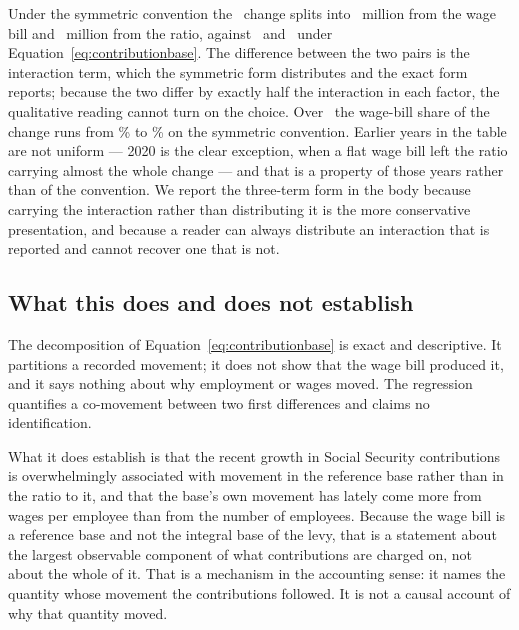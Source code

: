 

Under the symmetric convention the \BaseYear\ change splits into \SymmetricWageBill\
million from the wage bill and \SymmetricRatio\ million from the ratio, against
\BaseFromWageBill\ and \BaseFromRatio\ under Equation~\eqref{eq:contributionbase}. The
difference between the two pairs is the interaction term, which the symmetric form
distributes and the exact form reports; because the two differ by exactly half the
interaction in each factor, the qualitative reading cannot turn on the choice. Over
\SymmetricShareWindow\ the wage-bill share of the change runs from
\SymmetricShareLow\% to \SymmetricShareHigh\% on the symmetric convention. Earlier
years in the table are not uniform --- 2020 is the clear exception, when a flat wage
bill left the ratio carrying almost the whole change --- and that is a property of
those years rather than of the convention. We report the three-term form in
the body because carrying the interaction rather than distributing it is the more
conservative presentation, and because a reader can always distribute an interaction that
is reported and cannot recover one that is not.

\subsection{What this does and does not establish}

The decomposition of Equation~\eqref{eq:contributionbase} is exact and descriptive. It
partitions a recorded movement; it does not show that the wage bill produced it, and it
says nothing about why employment or wages moved. The regression quantifies a
co-movement between two first differences and claims no identification.

What it does establish is that the recent growth in Social Security contributions is
overwhelmingly associated with movement in the reference base rather than in the ratio to
it, and that the base's own movement has lately come more from wages per employee than
from the number of employees. Because the wage bill is a reference base and not the
integral base of the levy, that is a statement about the largest observable component of
what contributions are charged on, not about the whole of it.
That is a mechanism in the accounting sense: it names the quantity whose movement the
contributions followed. It is not a causal account of why that quantity moved.
